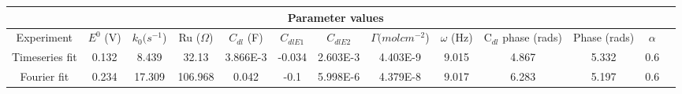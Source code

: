 \documentclass[preview]{standalone}
\begin{document}
\begin{center}
\begin{tabular}{|c|c|c|c|c|c|c|c|c|c|c|c|c|}
\hline
\multicolumn{12}{|c|}{Parameter values}\\ 
\hline
Experiment & $E^0$ (V) & $k_0 (s^{-1}$) & Ru ($\Omega$) & $C_{dl}$ (F) & $C_{dlE1}$ & $C_{dlE2}$ & $\Gamma (mol cm^{-2}$) & $\omega$ (Hz) & C$_{dl}$ phase (rads) & Phase (rads) & $\alpha$\\
\hline
Timeseries fit & 0.132 & 8.439 & 32.13 & 3.866E-3 & -0.034 & 2.603E-3 & 4.403E-9 & 9.015 & 4.867 & 5.332 & 0.6\\
\hline
Fourier fit & 0.234 & 17.309 & 106.968 & 0.042 & -0.1 & 5.998E-6 & 4.379E-8 & 9.017 & 6.283 & 5.197 & 0.6\\
\hline
\end{tabular}
\end{center}
\end{document}
